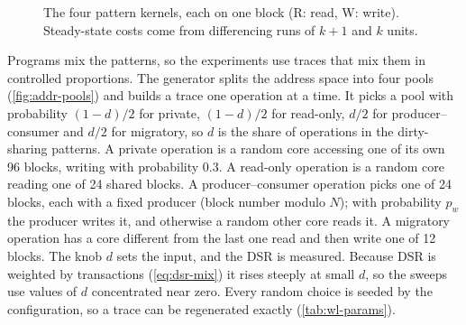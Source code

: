 \begin{figure}[htbp]
\centering
\begin{bigfig}[0.92]
\end{bigfig}
\caption[The four pattern kernels]{The four pattern kernels, each on one block (R:
read, W: write). Steady-state costs come from differencing runs of $k+1$ and $k$
units.}
\label{fig:kernels}
\end{figure}

Programs mix the patterns, so the experiments use traces that mix them in
controlled proportions. The generator splits the address space into four pools
(\cref{fig:addr-pools}) and builds a trace one operation at a time. It picks a pool
with probability $(1-d)/2$ for private, $(1-d)/2$ for read-only, $d/2$ for
producer--consumer and $d/2$ for migratory, so $d$ is the share of operations in
the dirty-sharing patterns. A private operation is a random core accessing one of
its own 96 blocks, writing with probability 0.3. A read-only operation is a random
core reading one of 24 shared blocks. A producer--consumer operation picks one of 24
blocks, each with a fixed producer (block number modulo $N$); with probability
$p_w$ the producer writes it, and otherwise a random other core reads it. A
migratory operation has a core different from the last one read and then write one
of 12 blocks. The knob $d$ sets the input, and the DSR is measured. Because DSR is
weighted by transactions (\cref{eq:dsr-mix}) it rises steeply at small $d$, so the
sweeps use values of $d$ concentrated near zero. Every random choice is seeded by
the configuration, so a trace can be regenerated exactly (\cref{tab:wl-params}).

